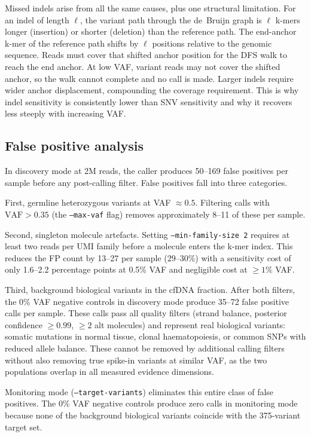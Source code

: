 Missed indels arise from all the same causes, plus one structural limitation.
For an indel of length $\ell$, the variant path through the de~Bruijn graph
is $\ell$ k-mers longer (insertion) or shorter (deletion) than the reference
path. The end-anchor k-mer of the reference path shifts by $\ell$ positions
relative to the genomic sequence. Reads must cover that shifted anchor
position for the DFS walk to reach the end anchor. At low VAF, variant reads
may not cover the shifted anchor, so the walk cannot complete and no call is
made. Larger indels require wider anchor displacement, compounding the
coverage requirement. This is why indel sensitivity is consistently lower than
SNV sensitivity and why it recovers less steeply with increasing VAF.

\subsection{False positive analysis}
\label{sec:eval:fp}

In discovery mode at 2M reads, the caller produces 50--169 false positives per
sample before any post-calling filter. False positives fall into three categories.

First, germline heterozygous variants at VAF $\approx 0.5$. Filtering calls with
$\text{VAF} > 0.35$ (the \texttt{--max-vaf} flag) removes approximately 8--11
of these per sample.

Second, singleton molecule artefacts. Setting \texttt{--min-family-size 2}
requires at least two reads per UMI family before a molecule enters the k-mer
index. This reduces the FP count by 13--27 per sample (29--30\%) with a
sensitivity cost of only 1.6--2.2 percentage points at 0.5\% VAF and negligible
cost at $\ge 1\%$ VAF.

Third, background biological variants in the cfDNA fraction. After both filters,
the 0\% VAF negative controls in discovery mode produce 35--72 false positive
calls per sample. These calls pass all quality filters (strand balance, posterior
confidence $\ge 0.99$, $\ge 2$ alt molecules) and represent real biological
variants: somatic mutations in normal tissue, clonal haematopoiesis, or common
SNPs with reduced allele balance. These cannot be removed by additional calling
filters without also removing true spike-in variants at similar VAF, as the two
populations overlap in all measured evidence dimensions.

Monitoring mode (\texttt{--target-variants}) eliminates this entire class of
false positives. The 0\% VAF negative controls produce zero calls in monitoring
mode because none of the background biological variants coincide with the
375-variant target set.

